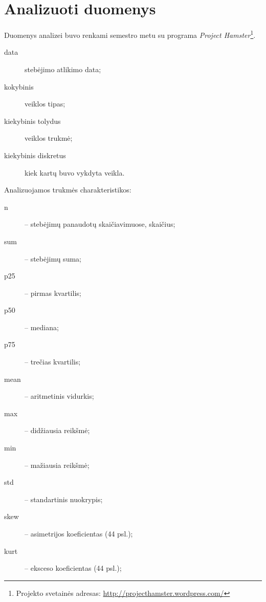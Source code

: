 \chapter{Analizuoti duomenys}

Duomenys analizei buvo renkami semestro metu su programa \emph{Project 
Hamster}\footnote{
Projekto svetainės adresas: \url{http://projecthamster.wordpress.com/}}.

\begin{description}
  \item[data] stebėjimo atlikimo data;
  \item[kokybinis] veiklos tipas;
  \item[kiekybinis tolydus] veiklos trukmė;
  \item[kiekybinis diskretus] kiek kartų buvo vykdyta veikla.
\end{description}

Analizuojamos trukmės charakteristikos:
\begin{description}
  \item[n] – stebėjimų panaudotų skaičiavimuose, skaičius;
  \item[sum] – stebėjimų suma;
  \item[p25] – pirmas kvartilis;
  \item[p50] – mediana;
  \item[p75] – trečias kvartilis;
  \item[mean] – aritmetinis vidurkis;
  \item[max] – didžiausia reikšmė;
  \item[min] – mažiausia reikšmė;
  \item[std] – standartinis nuokrypis;
  \item[skew] – asimetrijos koeficientas (44 psl.);
  \item[kurt] – eksceso koeficientas (44 psl.);
\end{description}

